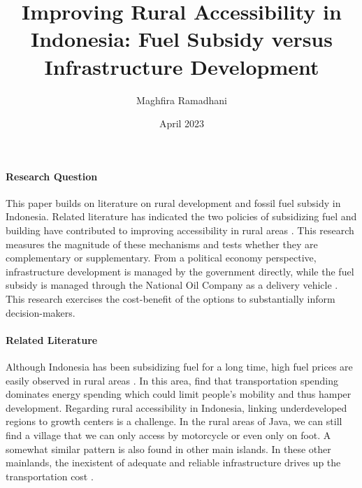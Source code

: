\documentclass[letterpaper,11pt,leqno]{article}
\begin{document}
\title{Improving Rural Accessibility in Indonesia: Fuel Subsidy versus Infrastructure Development}
\author{Maghfira Ramadhani}
\date{April 2023}       
\maketitle
 
\paragraph{Research Question} This paper builds on literature on rural development and fossil fuel subsidy in Indonesia. Related literature has indicated the two policies of subsidizing fuel and building have contributed to improving accessibility in rural areas \citep{asher_2020,hartojo_2022,ichsan_2021}. This research measures the magnitude of these mechanisms and tests whether they are complementary or supplementary. From a political economy perspective, infrastructure development is managed by the government directly, while the fuel subsidy is managed through the National Oil Company as a delivery vehicle \citep{ichsan_2022}. This research exercises the cost-benefit of the options to substantially inform decision-makers.

\paragraph{Related Literature} Although Indonesia has been subsidizing fuel for a long time, high fuel prices are easily observed in rural areas \citep{liputan_2016, jawapos_2017}. In this area, \citet{sambodo_2019} find that transportation spending dominates energy spending which could limit people's mobility and thus hamper development. Regarding rural accessibility in Indonesia, linking underdeveloped regions to growth centers is a challenge. In the rural areas of Java, we can still find a village that we can only access by motorcycle or even only on foot. A somewhat similar pattern is also found in other main islands. In these other mainlands, the inexistent of adequate and reliable infrastructure drives up the transportation cost \citep{sandee_2016}.
\end{document}
